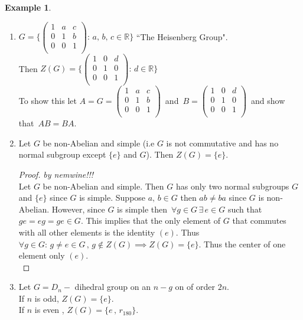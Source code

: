 \documentclass[11pt,a4paper]{article}
\theoremstyle{definition}
\newtheorem{exa}[thm]{Example}
\begin{document}
\begin{exa}
\begin{enumerate}
\item $G = \Bigg\{\begin{pmatrix}
1 & a & c\\
0 & 1 & b\\
0 & 0 & 1\\
\end{pmatrix}:\, a,\, b,\, c\in \mathbb{R}\Bigg\}$  ``The Heisenberg Group".\\

Then $Z(G) = \Bigg\{\begin{pmatrix}
1 & 0 & d\\
0 & 1 & 0\\
0 & 0 & 1\\
\end{pmatrix}:\, d\in \mathbb{R}\Bigg\}$\\

To show this let $A =  G = \begin{pmatrix}
1 & a & c\\
0 & 1 & b\\
0 & 0 & 1\\
\end{pmatrix}\, $ and $\, B = \begin{pmatrix}
1 & 0 & d\\
0 & 1 & 0\\
0 & 0 & 1\\
\end{pmatrix}\,$ and show that $\, AB = BA$.\\


\item Let $G$ be non-Abelian and simple (i.e $G$ is not commutative and has no normal subgroup except $\{e\}$ and $G$). Then $Z(G) = \{e\}$.\\

\begin{proof}
\textit{by nemwine!!!}\\
Let $G$ be non-Abelian and simple. Then $G$ has only two normal subgroups $G$ and $\{e\}$ since $G$ is simple. Suppose $a,\, b\in G$ then $ab\neq ba$ since $G$ is non-Abelian. However, since $G$ is simple then $\, \forall g\in G\, \exists\, e\in G$ such that $ge = eg = ge\in G$. This implies that the only element of $G$  that commutes with all other elements is the identity $(e)$. Thus $\forall g\in G:\, g\neq e\in G\, ,\, g\not\in Z(G)\implies Z(G) = \{e\}$. Thus the center of one element only $(e)$.\\
\end{proof}


\item Let $G = D_n - $ dihedral group on an $n-g$ on of order $2n$.\\
If $n$ is odd, $Z(G) = \{e\}$.\\
If $n$ is even , $Z(G) = \{e\, , \, r_{180}\}$.\\\\
\end{enumerate}
\end{exa}
\end{document}
